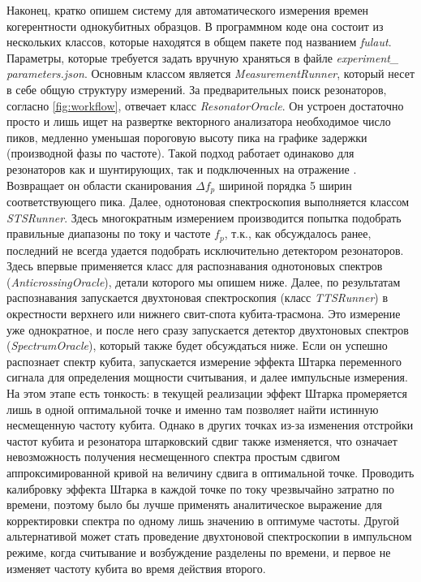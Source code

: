 \documentclass[14pt, a4paper]{extreport}
\numberwithin{equation}{section}
\begin{document}
Наконец, кратко опишем систему для автоматического измерения времен когерентности однокубитных образцов. В программном коде она состоит из нескольких классов, которые находятся в общем пакете под названием \textit{fulaut}. Параметры, которые требуется задать вручную храняться в файле \foreignlanguage{english}{\textit{experiment\_ parameters.json}}. Основным классом является \textit{MeasurementRunner}, который несет в себе общую структуру измерений. За предварительных поиск резонаторов, согласно \autoref{fig:workflow}, отвечает класс \textit{ResonatorOracle}. Он устроен достаточно просто и лишь ищет на развертке векторного анализатора необходимое число пиков, медленно уменьшая пороговую высоту пика на графике задержки (производной фазы по частоте). Такой подход работает одинаково для резонаторов как и шунтирующих, так и подключенных на отражение \cite{probst2015efficient}. Возвращает он области сканирования $\Delta f_p$ шириной порядка 5 ширин соответствующего пика. Далее, однотоновая спектроскопия выполняется классом \textit{STSRunner}. Здесь многократным измерением производится попытка подобрать правильные диапазоны по току и частоте $f_p$, т.к., как обсуждалось ранее, последний не всегда удается подобрать исключительно детектором резонаторов. Здесь впервые применяется класс для распознавания однотоновых спектров (\textit{AnticrossingOracle}), детали которого мы опишем ниже. Далее, по результатам распознавания запускается двухтоновая спектроскопия (класс \textit{TTSRunner}) в окрестности верхнего или нижнего свит-спота кубита-трасмона. Это измерение уже однократное, и после него сразу запускается детектор двухтоновых спектров (\textit{SpectrumOracle}), который также будет обсуждаться ниже. Если он успешно распознает спектр кубита, запускается измерение эффекта Штарка переменного сигнала для определения мощности считывания, и далее импульсные измерения. На этом этапе есть тонкость: в текущей реализации эффект Штарка промеряется лишь в одной оптимальной точке и именно там позволяет найти истинную несмещенную частоту кубита. Однако в других точках из-за изменения отстройки частот кубита и резонатора штарковский сдвиг также изменяется, что означает невозможность получения несмещенного спектра простым сдвигом аппроксимированной кривой на величину сдвига в оптимальной точке. Проводить калибровку эффекта Штарка в каждой точке по току чрезвычайно затратно по времени, поэтому было бы лучше применять аналитическое выражение для корректировки спектра по одному лишь значению в оптимуме частоты. Другой альтернативой может стать проведение двухтоновой спектроскопии в импульсном режиме, когда считывание и возбуждение разделены по времени, и первое не изменяет частоту кубита во время действия второго.
\end{document}
